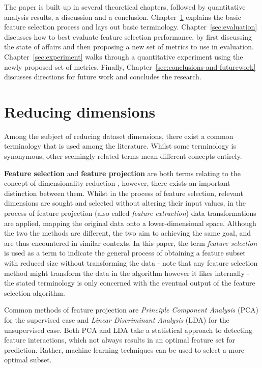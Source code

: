 \documentclass{article}
\begin{document}
The paper is built up in several theoretical chapters, followed by quantitative analysis results, a discussion and a conclusion. Chapter~\ref{sec:reducing-dimensions} explains the basic feature selection process and lays out basic terminology. Chapter~\ref{sec:evaluation} discusses how to best evaluate feature selection performance, by first discussing the state of affairs and then proposing a new set of metrics to use in evaluation. Chapter~\ref{sec:experiment} walks through a quantitative experiment using the newly proposed set of metrics. Finally, Chapter~\ref{sec:conclusions-and-futurework} discusses directions for future work and concludes the research.

\section{Reducing dimensions}\label{sec:reducing-dimensions}
Among the subject of reducing dataset dimensions, there exist a common terminology that is used among the literature. Whilst some terminology is synonymous, other seemingly related terms mean different concepts entirely.

\textbf{Feature selection} and \textbf{feature projection} are both terms relating to the concept of dimensionality reduction \citep{cunningham2007dimension}, however, there exists an important distinction between them. Whilst in the process of feature selection, relevant dimensions are sought and selected without altering their input values, in the process of feature projection (also called \textit{feature extraction}) data transformations are applied, mapping the original data onto a lower-dimensional space. Although the two the methods are different, the two aim to achieving the same goal, and are thus encountered in similar contexts. In this paper, the term \textit{feature selection} is used as a term to indicate the general process of obtaining a feature subset with reduced size without transforming the data - note that any feature selection method might transform the data in the algorithm however it likes internally - the stated terminology is only concerned with the eventual output of the feature selection algorithm.

Common methods of feature projection are \textit{Principle Component Analysis} (PCA) for the supervised case and \textit{Linear Discriminant Analysis} (LDA) for the unsupervised case. Both PCA and LDA take a statistical approach to detecting feature interactions, which not always results in an optimal feature set for prediction. Rather, machine learning techniques can be used to select a more optimal subset.
\end{document}
